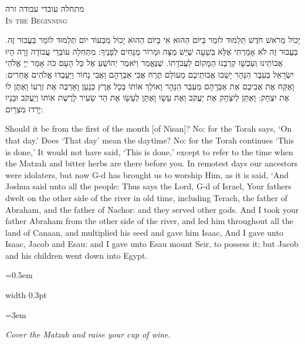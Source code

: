 \documentclass[11pt, openany]{book}
\newcommand{\instruction}[1]{%
  \par\vspace{3pt}
  \begin{tcolorbox}[
    enhanced,
    breakable,
    colback=sederlight,
    colframe=sederlight,
    boxrule=0pt,
    left=10pt,
    right=6pt,
    top=4pt,
    bottom=4pt,
    borderline west={2pt}{0pt}{sederwine!60},
    arc=0pt,
    outer arc=0pt,
  ]
    {\small\itshape\textcolor{sederwine}{#1}}
  \end{tcolorbox}
  \par\vspace{2pt}
}
\newcommand{\sederdivider}{%
  \par\vspace{6pt}
  \begin{center}
    \textcolor{sedergold}{\pgfornament[width=1.5cm]{11}}
  \end{center}
  \par\vspace{6pt}
}
\newlength{\bidiHebWidth}
\newlength{\bidiEngWidth}
\newenvironment{bilingual}{%
  \par\vspace{4pt}%
}{%
  \noindent
  \begin{minipage}[t]{\bidiEngWidth}
    \setstretch{1.4}\emergencystretch=0.5em\normalsize
    \usebox{\bidiEngBox}
  \end{minipage}%
  \hfill
  {\color{sedergold}\vrule width 0.3pt}%
  \hfill
  \begin{minipage}[t]{\bidiHebWidth}
    \begingroup\hebrewfont\TeXXeTstate=1\beginR
    \large\setstretch{1.4}\emergencystretch=3em\tolerance=9999\parindent=0pt\relax
    \usebox{\bidiHebBox}
    \endR\endgroup
  \end{minipage}%
  \par\vspace{2pt}%
}
\newenvironment{hebrewcol}{%
  \begin{lrbox}{\bidiHebBox}\begin{minipage}{\bidiHebWidth}%
}{%
  \end{minipage}\end{lrbox}%
}
\newenvironment{englishcol}{%
  \begin{lrbox}{\bidiEngBox}\begin{minipage}{\bidiEngWidth}%
}{%
  \end{minipage}\end{lrbox}%
}
\newcommand{\subsedertitle}[2]{%
  \par\vspace{8pt}
  \begin{center}
    {\hebrewfontlarge\TeXXeTstate=1\beginR\textcolor{sederblue}{#1}\endR}\\[3pt]
    {\normalsize\scshape\textcolor{sederblue}{#2}}
  \end{center}
  \par\vspace{3pt}
}
\begin{document}
\subsedertitle{מתחלה עובדי עבודה זרה}{In the Beginning}

\begin{bilingual}
\begin{hebrewcol}
יָכוֹל מֵרֹאשׁ חֹדֶשׁ תַּלְמוּד לוֹמַר בַּיּוֹם הַהוּא אִי בַּיּוֹם הַהוּא יָכוֹל מִבְּעוֹד יוֹם תַּלְמוּד לוֹמַר בַּעֲבוּר זֶה. בַּעֲבוּר זֶה לֹא אָמַרְתִּי אֶלָּא בְּשָׁעָה שֶׁיֵּשׁ מַצָּה וּמָרוֹר מֻנָּחִים לְפָנֶיךָ:
מִתְּחִלָה עוֹבְדֵי עֲבוֹדָה זָרָה הָיוּ אֲבוֹתֵינוּ וְעַכְשָׁו קֵרְבָנוּ הַמָּקוֹם לַעֲבֹדָתוֹ. שֶׁנֶּאֱמַר וַיֹּאמֶר יְהוֹשֻׁעַ אֶל כָּל הָעָם כֹּה אָמַר יְיָ אֱלֹהֵי יִשְׂרָאֵל בְּעֵבֶר הַנָּהָר יָשְׁבוּ אֲבוֹתֵיכֶם מֵעוֹלָם תֶּרַח אֲבִי אַבְרָהָם וַאֲבִי נָחוֹר וַיַּעַבְדוּ אֱלֹהִים אֲחֵרִים:
וָאֶקַּח אֶת אֲבִיכֶם אֶת אַבְרָהָם מֵעֵבֶר הַנָּהָר וָאוֹלֵךְ אוֹתוֹ בְּכָל אֶרֶץ כְּנָעַן וָאַרְבֶּה אֶת זַרְעוֹ וָאֶתֶּן לוֹ אֶת יִצְחָק: וָאֶתֵּן לְיִצְחָק אֶת יַעֲקֹב וְאֶת עֵשָׂו וָאֶתֵּן לְעֵשָׂו אֶת הַר שֵׂעִיר לָרֶשֶׁת אוֹתוֹ וְיַעֲקֹב וּבָנָיו יָרְדוּ מִצְרָיִם:
\end{hebrewcol}
\begin{englishcol}
Should it be from the first of the month [of Nisan]? No: for the Torah says, `On that day.' Does `That day' mean the daytime? No: for the Torah continues `This is done,' It would not have said, `This is done,' except to refer to the time when the Matzah and bitter herbs are there before you.
In remotest days our ancestors were idolaters, but now G-d has brought us to worship Him, as it is said, `And Joshua said unto all the people: Thus says the Lord, G-d of Israel, Your fathers dwelt on the other side of the river in old time, including Terach, the father of Abraham, and the father of Nachor: and they served other gods.
And I took your father Abraham from the other side of the river, and led him throughout all the land of Canaan, and multiplied his seed and gave him Isaac, And I gave unto Isaac, Jacob and Esau: and I gave unto Esau mount Seir, to possess it; but Jacob and his children went down into Egypt.
\end{englishcol}
\end{bilingual}
\sederdivider

\instruction{Cover the Matzah and raise your cup of wine.}
\end{document}
